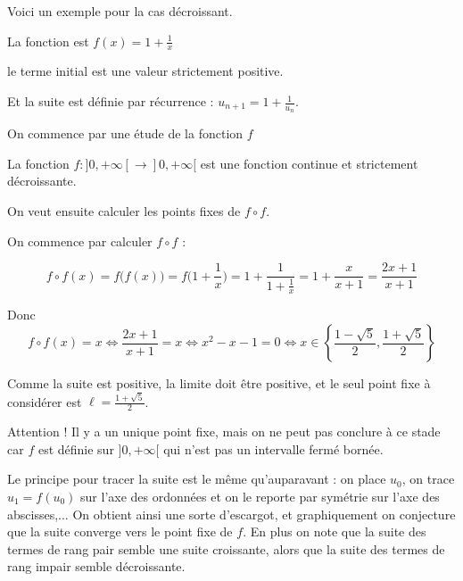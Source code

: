 \diapo

Voici un exemple pour la cas décroissant.

La fonction est $f(x)=1+\frac1x$

le terme initial est une valeur strictement positive.

Et la suite est définie par récurrence : $u_{n+1} = 1 + \frac{1}{u_n}$.

\change

On commence par une étude de la fonction $f$

La fonction $f : ]0,+\infty[\to ]0,+\infty[$ est 
  une fonction continue et strictement décroissante.
  

  \change
  
  On veut ensuite calculer les  points fixes de $f\circ f$.
  
  On commence par calculer $f\circ f$ :
  
  $$f\circ f(x)= f\big( f(x)\big)= f\big(1+\frac1x\big)= 1+ \frac{1}{1+\frac1x}=1+\frac{x}{x+1} = \frac{2x+1}{x+1}$$
  
  
  \change
  
  Donc 
  $$f\circ f(x)=x \iff  \frac{2x+1}{x+1} = x \iff x^2-x-1=0 \iff x \in 
\left\{\frac{1-\sqrt{5}}{2},\frac{1+\sqrt{5}}{2}\right\}$$
  
  \change
  
  Comme la suite est positive, la limite doit être positive, et le seul point fixe à considérer est $\ell=\frac{1+\sqrt{5}}{2}$.
  
  Attention ! Il y a un unique point fixe, mais on ne peut pas conclure 
  à ce stade car $f$ est définie sur $]0,+\infty[$ qui n'est pas un intervalle fermé bornée.
   
  


\diapo

Le principe pour tracer la suite est le même qu'auparavant : on place $u_0$,
on trace $u_1=f(u_0)$ sur l'axe des ordonnées et on le reporte par symétrie sur l'axe des abscisses,...
On obtient ainsi une sorte d'escargot, et graphiquement on conjecture que la suite converge
vers le point fixe de $f$. En plus on note que la suite des termes de rang pair semble une suite croissante,
alors que la suite des termes de rang impair semble décroissante.



\diapo


